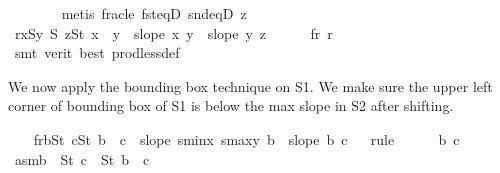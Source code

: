 \begin{isabellebody}
\ \ \ \ \ \ \isamarkupfalse%
\ {\isacharparenleft}{\kern0pt}metis\ frac{\isacharunderscore}{\kern0pt}le\ fst{\isacharunderscore}{\kern0pt}eqD\ snd{\isacharunderscore}{\kern0pt}eqD\ z{}{\isacharparenleft}{\kern0pt}{}{\isacharparenright}{\kern0pt}{\isacharparenright}{\kern0pt}\isanewline
\ \ \isamarkupfalse%
\isanewline
\ \ \isamarkupfalse%
\ r{}{\isacharcolon}{\kern0pt}{\isachardoublequoteopen}{\isasymforall}x{\isasymin}S{}{\isachardot}{\kern0pt}{\isasymforall}y{\isasymin}\ S{}{\isachardot}{\kern0pt}\ {\isasymforall}z{\isasymin}S{}t{\isachardot}{\kern0pt}\ x\ {\isacharless}{\kern0pt}\ y\ {\isasymlongrightarrow}\ slope\ x\ y\ {\isacharless}{\kern0pt}\ slope\ y\ z{\isachardoublequoteclose}\isanewline
\ \ \ \ \isamarkupfalse%
\ f{}r{}\ r{}\ \isamarkupfalse%
\ {\isacharparenleft}{\kern0pt}smt\ {\isacharparenleft}{\kern0pt}verit{\isacharcomma}{\kern0pt}\ best{\isacharparenright}{\kern0pt}\ prod{\isacharunderscore}{\kern0pt}less{\isacharunderscore}{\kern0pt}def{\isacharparenright}{\kern0pt}%
\begin{isamarkuptext}%
We now apply the bounding box technique on S1. We make sure the upper left corner of bounding box of S1 is below the max slope in S2 after shifting.%
\end{isamarkuptext}\isamarkuptrue%
\ \ \isamarkupfalse%
\ f{}r{}{\isacharcolon}{\kern0pt}{\isachardoublequoteopen}{\isasymforall}b{\isasymin}S{}t{\isachardot}{\kern0pt}\ {\isasymforall}c{\isasymin}S{}t{\isachardot}{\kern0pt}\ b\ {\isacharless}{\kern0pt}\ c\ {\isasymlongrightarrow}\ slope\ {\isacharparenleft}{\kern0pt}s{}{\isacharunderscore}{\kern0pt}minx{\isacharcomma}{\kern0pt}\ s{}{\isacharunderscore}{\kern0pt}maxy{\isacharparenright}{\kern0pt}\ b\ {\isachargreater}{\kern0pt}\ slope\ b\ c{\isachardoublequoteclose}\isanewline
\ \ \isamarkupfalse%
{\isacharparenleft}{\kern0pt}rule{\isacharplus}{\kern0pt}{\isacharparenright}{\kern0pt}\isanewline
\ \ \ \ \isamarkupfalse%
\ b\ c\ \isamarkupfalse%
\ asm{\isacharcolon}{\kern0pt}{\isachardoublequoteopen}b\ {\isasymin}\ S{}t{\isachardoublequoteclose}\ {\isachardoublequoteopen}c\ {\isasymin}\ S{}t{\isachardoublequoteclose}\ {\isachardoublequoteopen}b\ {\isacharless}{\kern0pt}\ c{\isachardoublequoteclose}\isanewline

\end{isabellebody}
